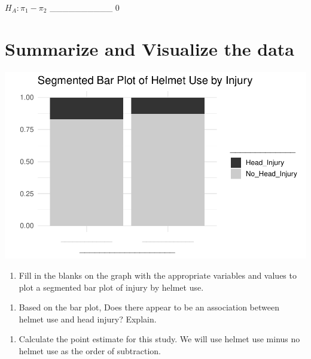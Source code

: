 \documentclass[
]{report}
\providecommand{\tightlist}{%
  \setlength{\itemsep}{0pt}\setlength{\parskip}{0pt}}
\begin{document}
\(H_A: \pi_1 -\pi_2\) \_\_\_\_\_\_\_\_\_\_ 0

\hypertarget{summarize-and-visualize-the-data}{%
\section{Summarize and Visualize the data}\label{summarize-and-visualize-the-data}}

\begin{center}\includegraphics[width=0.7\linewidth]{07-inference-2cat_files/figure-latex/unnamed-chunk-2-1} \end{center}

\begin{enumerate}
\def\labelenumi{\arabic{enumi}.}
\setcounter{enumi}{11}
\tightlist
\item
  Fill in the blanks on the graph with the appropriate variables and values to plot a segmented bar plot of injury by helmet use.
\end{enumerate}

\vspace{1in}

\begin{enumerate}
\def\labelenumi{\arabic{enumi}.}
\setcounter{enumi}{12}
\tightlist
\item
  Based on the bar plot, Does there appear to be an association between helmet use and head injury? Explain.
\end{enumerate}

\vspace{1in}

\begin{enumerate}
\def\labelenumi{\arabic{enumi}.}
\setcounter{enumi}{13}
\tightlist
\item
  Calculate the point estimate for this study. We will use helmet use minus no helmet use as the order of subtraction.
\end{enumerate}

\vspace{1in}
\end{document}
